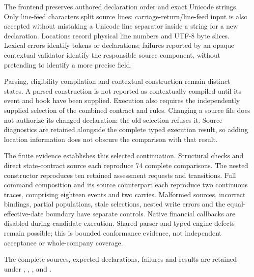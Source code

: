 The frontend preserves authored declaration order and exact Unicode strings.
Only line-feed characters split source lines; carriage-return/line-feed input
is also accepted without mistaking a Unicode line separator inside a string
for a new declaration. Locations record physical line numbers and UTF-8 byte
slices. Lexical errors identify tokens or declarations; failures reported by
an opaque contextual validator identify the responsible source component,
without pretending to identify a more precise field.

Parsing, eligibility compilation and contextual construction remain distinct
states. A parsed construction is not reported as contextually compiled until
its event and book have been supplied. Execution also requires the independently
supplied selection of the combined contract and rules. Changing a source file
does not authorize its changed declaration: the old selection refuses it.
Source diagnostics are retained alongside the complete typed execution result,
so adding location information does not obscure the comparison with that result.

The finite evidence establishes this selected continuation. Structural checks
and direct state-contract source each reproduce 74 complete comparisons. The
nested constructor reproduces ten retained assessment requests and transitions.
Full command composition and its source counterpart each reproduce two
continuous traces, comprising eighteen events and two carries. Malformed
sources, incorrect bindings, partial populations, stale selections, nested
write errors and the equal-effective-date boundary have separate controls.
Native financial callbacks are disabled during candidate execution. Shared
parser and typed-engine defects remain possible; this is bounded conformance
evidence, not independent acceptance or whole-company coverage.

\begingroup\raggedright
The complete sources, expected declarations, failures and results are retained
under ,
,
,
 and
.
\par\endgroup
